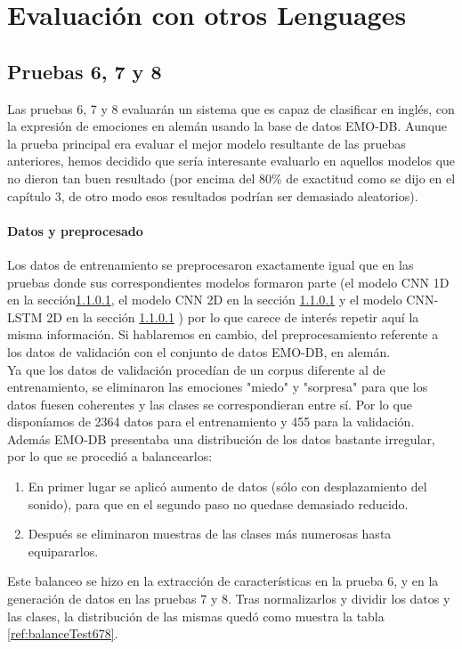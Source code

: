\documentclass[11pt,a4paper,spanish]{book}
\begin{document}
	\section{Evaluación con otros Lenguages}
	
	\subsection{Pruebas 6, 7 y 8}
	Las pruebas 6, 7 y 8 evaluarán un sistema que es capaz de clasificar en inglés, con la expresión de emociones en alemán usando la base de datos EMO-DB. Aunque la prueba principal era evaluar el mejor modelo resultante de las pruebas anteriores, hemos decidido que sería interesante evaluarlo en aquellos modelos que no dieron tan buen resultado (por encima del 80\% de exactitud como se dijo en el capítulo 3, de otro modo esos resultados podrían ser demasiado aleatorios).
	 
	\paragraph{Datos y preprocesado}
	Los datos de entrenamiento se preprocesaron exactamente igual que en las pruebas donde sus correspondientes modelos formaron parte (el modelo CNN 1D en la sección\ref{}, el modelo CNN 2D en la sección \ref{} y el modelo CNN-LSTM 2D en la sección \ref{} ) por lo que carece de interés repetir aquí la misma información. Si hablaremos en cambio, del preprocesamiento referente a los datos de validación con el conjunto de datos EMO-DB, en alemán. \\
	
	Ya que los datos de validación procedían de un corpus diferente al de entrenamiento, se eliminaron las emociones "miedo" y "sorpresa" para que los datos fuesen coherentes y las clases se correspondieran entre sí. Por lo que disponíamos de 2364 datos para el entrenamiento y 455 para la validación.\\
	Además EMO-DB presentaba una distribución de los datos bastante irregular, por lo que se procedió a balancearlos:
	\begin{enumerate}
		\item En primer lugar se aplicó aumento de datos (sólo con desplazamiento del sonido), para que en el segundo paso no quedase demasiado reducido.
		\item Después se eliminaron muestras de las clases más numerosas hasta equipararlos.
	\end{enumerate}
	Este balanceo se hizo en la extracción de características en la prueba 6, y en la generación de datos en las pruebas 7 y 8. Tras normalizarlos y dividir los datos y las clases, la distribución de las mismas quedó como muestra la tabla \ref{ref:balanceTest678}.
	
\end{document}
